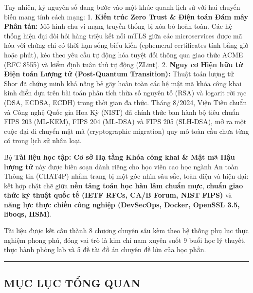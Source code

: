 \documentclass[
]{article}
\begin{document}
Tuy nhiên, kỷ nguyên số đang bước vào một khúc quanh lịch sử với hai
chuyển biến mang tính cách mạng: 1. \textbf{Kiến trúc Zero Trust \& Điện
toán Đám mây Phân tán:} Mô hình chu vi mạng truyền thống bị xóa bỏ hoàn
toàn. Các hệ thống hiện đại đòi hỏi hàng triệu kết nối mTLS giữa các
microservices được mã hóa với chứng chỉ có thời hạn sống biểu kiến
(ephemeral certificates tính bằng giờ hoặc phút), kéo theo yêu cầu tự
động hóa tuyệt đối thông qua giao thức ACME (RFC 8555) và kiểm định tuân
thủ tự động (ZLint). 2. \textbf{Nguy cơ Hiện hữu từ Điện toán Lượng tử
(Post-Quantum Transition):} Thuật toán lượng tử Shor đã chứng minh khả
năng bẻ gãy hoàn toàn các hệ mật mã khóa công khai kinh điển dựa trên
bài toán phân tích thừa số nguyên tố (RSA) và logarit rời rạc (DSA,
ECDSA, ECDH) trong thời gian đa thức. Tháng 8/2024, Viện Tiêu chuẩn và
Công nghệ Quốc gia Hoa Kỳ (NIST) đã chính thức ban hành bộ tiêu chuẩn
FIPS 203 (ML-KEM), FIPS 204 (ML-DSA) và FIPS 205 (SLH-DSA), mở ra một
cuộc đại di chuyển mật mã (cryptographic migration) quy mô toàn cầu chưa
từng có trong lịch sử nhân loại.

Bộ \textbf{Tài liệu học tập: Cơ sở Hạ tầng Khóa công khai \& Mật mã Hậu
lượng tử} này được biên soạn dành riêng cho học viên cao học ngành An
toàn Thông tin (CHAT4P) nhằm trang bị một góc nhìn sâu sắc, toàn diện và
hiện đại: kết hợp chặt chẽ giữa \textbf{nền tảng toán học hàn lâm chuẩn
mực}, \textbf{chuẩn giao thức kỹ thuật quốc tế (IETF RFCs, CA/B Forum,
NIST FIPS)} và \textbf{năng lực thực chiến công nghiệp (DevSecOps,
Docker, OpenSSL 3.5, liboqs, HSM)}.

Tài liệu được kết cấu thành 8 chương chuyên sâu kèm theo hệ thống phụ
lục thực nghiệm phong phú, đóng vai trò là kim chỉ nam xuyên suốt 9 buổi
học lý thuyết, thực hành phòng lab và 5 đề tài đồ án chuyên đề lớn của
học phần.

\begin{center}\rule{0.5\linewidth}{0.5pt}\end{center}

\subsection{MỤC LỤC TỔNG QUAN}\label{mux1ee5c-lux1ee5c-tux1ed5ng-quan}
\end{document}

